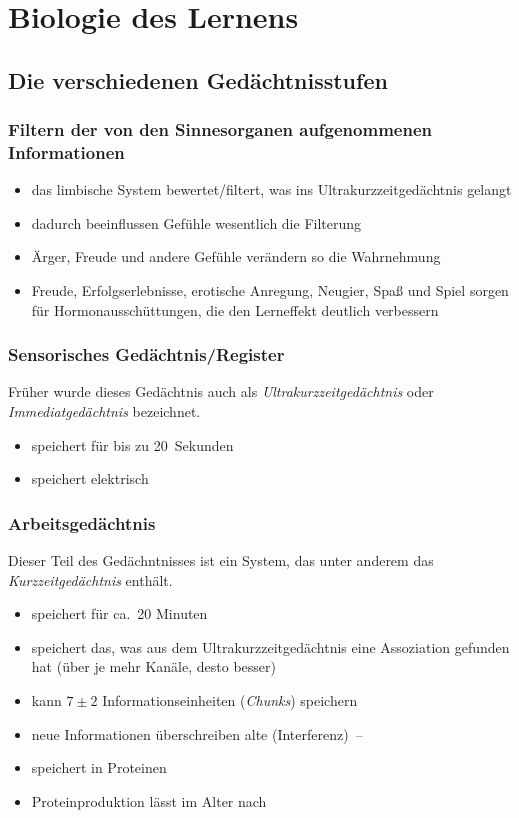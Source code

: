 \section{Biologie des Lernens}

\subsection{Die verschiedenen Gedächtnisstufen}
\subsubsection{Filtern der von den Sinnesorganen aufgenommenen Informationen}
\begin{itemize}
  \item das limbische System bewertet/filtert, was ins Ultrakurzzeitgedächtnis gelangt
  \item dadurch beeinflussen Gefühle wesentlich die Filterung
  \item Ärger, Freude und andere Gefühle verändern so die Wahrnehmung
  \item Freude, Erfolgserlebnisse, erotische Anregung, Neugier, Spaß und Spiel sorgen für Hormonausschüttungen, die den Lerneffekt deutlich verbessern
\end{itemize}

\subsubsection{Sensorisches Gedächtnis/Register}
Früher wurde dieses Gedächtnis auch als \emph{Ultrakurzzeitgedächtnis} oder \emph{Immediatgedächtnis} bezeichnet.

\begin{itemize}
  \item speichert für bis zu 20~Sekunden
  \item speichert elektrisch
\end{itemize}

\subsubsection{Arbeitsgedächtnis}
Dieser Teil des Gedächntnisses ist ein System, das unter anderem das \emph{Kurzzeitgedächtnis} enthält.
\begin{itemize}
  \item speichert für ca.~20 Minuten
  \item speichert das, was aus dem Ultrakurzzeitgedächtnis eine Assoziation gefunden hat (über je mehr Kanäle, desto besser)
  \item kann $7\pm 2$ Informationseinheiten (\emph{Chunks}) speichern
  \item neue Informationen überschreiben alte (Interferenz)~-- 
  \item speichert in Proteinen
  \item Proteinproduktion lässt im Alter nach
\end{itemize}

